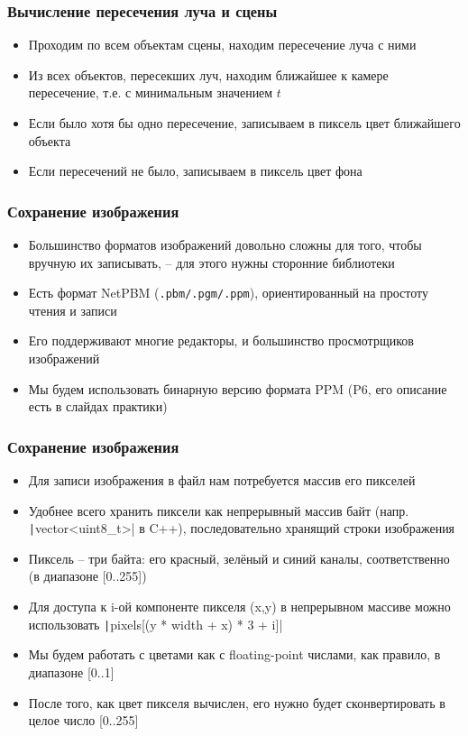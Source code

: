 \documentclass[10pt]{beamer}
\begin{document}
\begin{frame}
\frametitle{Вычисление пересечения луча и сцены}
\begin{itemize}
\item Проходим по всем объектам сцены, находим пересечение луча с ними
\pause
\item Из всех объектов, пересекших луч, находим ближайшее к камере пересечение, т.е. с минимальным значением \begin{math}t\end{math}
\pause
\item Если было хотя бы одно пересечение, записываем в пиксель цвет ближайшего объекта
\pause
\item Если пересечений не было, записываем в пиксель цвет фона
\end{itemize}
\end{frame}

\begin{frame}
\frametitle{Сохранение изображения}
\begin{itemize}
\item Большинство форматов изображений довольно сложны для того, чтобы вручную их записывать, -- для этого нужны сторонние библиотеки
\pause
\item Есть формат NetPBM (\texttt{.pbm/.pgm/.ppm}), ориентированный на простоту чтения и записи
\pause
\item Его поддерживают многие редакторы, и большинство просмотрщиков изображений
\pause
\item Мы будем использовать бинарную версию формата PPM (P6, его описание есть в слайдах практики)
\end{itemize}
\end{frame}

\begin{frame}
\frametitle{Сохранение изображения}
\begin{itemize}
\item Для записи изображения в файл нам потребуется массив его пикселей
\pause
{}
\item Удобнее всего хранить пиксели как непрерывный массив байт (напр. \texttt|vector<uint8_t>| в C++), последовательно хранящий строки изображения
\pause
\item Пиксель -- три байта: его {\color{red}красный}, {\color{green}зелёный} и {\color{blue}синий} каналы, соответственно (в диапазоне [0..255])
\pause
\item Для доступа к i-ой компоненте пикселя (x,y) в непрерывном массиве можно использовать \texttt|pixels[(y * width + x) * 3 + i]|
\pause
\item Мы будем работать с цветами как с floating-point числами, как правило, в диапазоне [0..1]
\pause
\item После того, как цвет пикселя вычислен, его нужно будет сконвертировать в целое число [0..255]
\end{itemize}
\end{frame}
\end{document}
